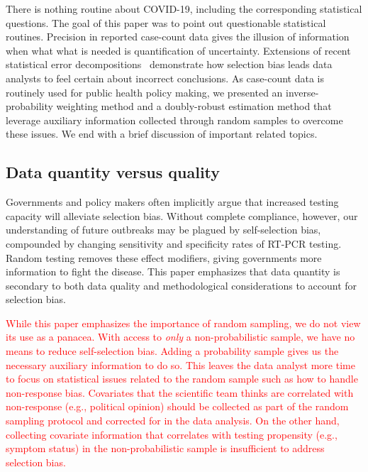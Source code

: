 \documentclass[11pt]{amsart}
\numberwithin{equation}{section}
\theoremstyle{plain}
\begin{document}
 There is nothing routine about COVID-19, including the corresponding statistical questions.  The goal of this paper was to point out questionable statistical routines.  Precision in reported case-count data gives the illusion of information when what what is needed is quantification of uncertainty. Extensions of recent statistical error decompositions~\citep{Meng2018} demonstrate how selection bias leads data analysts to feel certain about incorrect conclusions.  As case-count data is routinely used for public health policy making, we presented an inverse-probability weighting method and a doubly-robust estimation method that leverage auxiliary information collected through random samples to overcome these issues. We end with a brief discussion of important related topics.

 \subsection*{Data quantity versus quality}

 Governments and policy makers often implicitly argue that increased testing capacity will alleviate selection bias.  Without complete compliance, however, our understanding of future outbreaks may be plagued by self-selection bias, compounded by changing sensitivity and specificity rates of RT-PCR testing. Random testing removes these effect modifiers, giving governments more information to fight the disease.  This paper emphasizes that data quantity is secondary to both data quality and methodological considerations to account for selection bias.

\textcolor{red}{
 While this paper emphasizes the importance of random sampling, we do not view its use as a panacea. With access to \emph{only} a non-probabilistic sample, we have no means to reduce self-selection bias.  Adding a probability sample gives us the necessary auxiliary information to do so.  This leaves the data analyst more time to focus on statistical issues related to the random sample such as how to handle non-response bias.  Covariates that the scientific team thinks are correlated with non-response (e.g., political opinion) should be collected as part of the random sampling protocol and corrected for in the data analysis. On the other hand, collecting covariate information that correlates with testing propensity (e.g., symptom status) in the non-probabilistic sample is insufficient to address selection bias.
}

\end{document}
